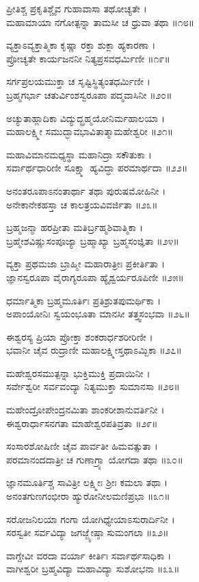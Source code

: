 ಪ್ರೀತಿಶ್ಚ ಪ್ರಕೃತಿಶ್ಚೈವ ಗುಹಾವಾಸಾ ತಥೋಚ್ಯತೇ ।\\
ಮಹಾಮಾಯಾ ನಗೋತ್ಪನ್ನಾ ತಾಮಸೀ ಚ ಧ್ರುವಾ ತಥಾ ॥೧೮॥

ವ್ಯಕ್ತಾಽವ್ಯಕ್ತಾತ್ಮಿಕಾ ಕೃಷ್ಣಾ ರಕ್ತಾ ಶುಕ್ಲಾ ಹ್ಯಕಾರಣಾ ।\\
ಪ್ರೋಚ್ಯತೇ ಕಾರ್ಯಜನನೀ ನಿತ್ಯಪ್ರಸವಧರ್ಮಿಣೀ ॥೧೯॥

ಸರ್ಗಪ್ರಲಯಮುಕ್ತಾ ಚ ಸೃಷ್ಟಿಸ್ಥಿತ್ಯಂತಧರ್ಮಿಣೀ ।\\
ಬ್ರಹ್ಮಗರ್ಭಾ ಚತುರ್ವಿಂಶಸ್ವರೂಪಾ ಪದ್ಮವಾಸಿನೀ ॥೨೦॥

ಅಚ್ಯುತಾಹ್ಲಾದಿಕಾ ವಿದ್ಯುದ್ಬ್ರಹ್ಮಯೋನಿರ್ಮಹಾಲಯಾ ।\\
ಮಹಾಲಕ್ಷ್ಮೀ ಸಮುದ್ಭಾವಭಾವಿತಾತ್ಮಾಮಹೇಶ್ವರೀ ॥೨೧॥

ಮಹಾವಿಮಾನಮಧ್ಯಸ್ಥಾ ಮಹಾನಿದ್ರಾ ಸಕೌತುಕಾ ।\\
ಸರ್ವಾರ್ಥಧಾರಿಣೀ ಸೂಕ್ಷ್ಮಾ ಹ್ಯವಿದ್ಧಾ ಪರಮಾರ್ಥದಾ ॥೨೨॥

ಅನಂತರೂಪಾಽನಂತಾರ್ಥಾ ತಥಾ ಪುರುಷಮೋಹಿನೀ ।\\
ಅನೇಕಾನೇಕಹಸ್ತಾ ಚ ಕಾಲತ್ರಯವಿವರ್ಜಿತಾ ॥೨೩॥

ಬ್ರಹ್ಮಜನ್ಮಾ ಹರಪ್ರೀತಾ ಮತಿರ್ಬ್ರಹ್ಮಶಿವಾತ್ಮಿಕಾ ।\\
ಬ್ರಹ್ಮೇಶವಿಷ್ಣುಸಂಪೂಜ್ಯಾ ಬ್ರಹ್ಮಾಖ್ಯಾ ಬ್ರಹ್ಮಸಂಜ್ಞಿತಾ ॥೨೪॥

ವ್ಯಕ್ತಾ ಪ್ರಥಮಜಾ ಬ್ರಾಹ್ಮೀ ಮಹಾರಾತ್ರೀಃ ಪ್ರಕೀರ್ತಿತಾ ।\\
ಜ್ಞಾನಸ್ವರೂಪಾ ವೈರಾಗ್ಯರೂಪಾ ಹ್ಯೈಶ್ವರ್ಯರೂಪಿಣೀ ॥೨೫॥

ಧರ್ಮಾತ್ಮಿಕಾ ಬ್ರಹ್ಮಮೂರ್ತಿಃ ಪ್ರತಿಶ್ರುತಪುಮರ್ಥಿಕಾ ।\\
ಅಪಾಂಯೋನಿಃ ಸ್ವಯಂಭೂತಾ ಮಾನಸೀ ತತ್ತ್ವಸಂಭವಾ ॥೨೬॥

ಈಶ್ವರಸ್ಯ ಪ್ರಿಯಾ ಪ್ರೋಕ್ತಾ ಶಂಕರಾರ್ಧಶರೀರಿಣೀ ।\\
ಭವಾನೀ ಚೈವ ರುದ್ರಾಣೀ ಮಹಾಲಕ್ಷ್ಮೀಸ್ತಥಾಽಮ್ಬಿಕಾ ॥೨೭॥

ಮಹೇಶ್ವರಸಮುತ್ಪನ್ನಾ ಭುಕ್ತಿಮುಕ್ತಿ ಪ್ರದಾಯಿನೀ ।\\
ಸರ್ವೇಶ್ವರೀ ಸರ್ವವಂದ್ಯಾ ನಿತ್ಯಮುಕ್ತಾ ಸುಮಾನಸಾ ॥೨೮॥

ಮಹೇಂದ್ರೋಪೇಂದ್ರನಮಿತಾ ಶಾಂಕರೀಶಾನುವರ್ತಿನೀ ।\\
ಈಶ್ವರಾರ್ಧಾಸನಗತಾ ಮಾಹೇಶ್ವರಪತಿವ್ರತಾ ॥೨೯॥

ಸಂಸಾರಶೋಷಿಣೀ ಚೈವ ಪಾರ್ವತೀ ಹಿಮವತ್ಸುತಾ ।\\
ಪರಮಾನಂದದಾತ್ರೀ ಚ ಗುಣಾಗ್ರ್ಯಾ ಯೋಗದಾ ತಥಾ ॥೩೦॥

ಜ್ಞಾನಮೂರ್ತಿಶ್ಚ ಸಾವಿತ್ರೀ ಲಕ್ಷ್ಮೀಃ ಶ್ರೀಃ ಕಮಲಾ ತಥಾ ।\\
ಅನಂತಗುಣಗಂಭೀರಾ ಹ್ಯುರೋನೀಲಮಣಿಪ್ರಭಾ ॥೩೧॥

ಸರೋಜನಿಲಯಾ ಗಂಗಾ ಯೋಗಿಧ್ಯೇಯಾಽಸುರಾರ್ದಿನೀ ।\\
ಸರಸ್ವತೀ ಸರ್ವವಿದ್ಯಾ ಜಗಜ್ಜ್ಯೇಷ್ಠಾ ಸುಮಂಗಲಾ ॥೩೨॥

ವಾಗ್ದೇವೀ ವರದಾ ವರ್ಯಾ ಕೀರ್ತಿಃ ಸರ್ವಾರ್ಥಸಾಧಿಕಾ ।\\
ವಾಗೀಶ್ವರೀ ಬ್ರಹ್ಮವಿದ್ಯಾ ಮಹಾವಿದ್ಯಾ ಸುಶೋಭನಾ ॥೩೩॥

